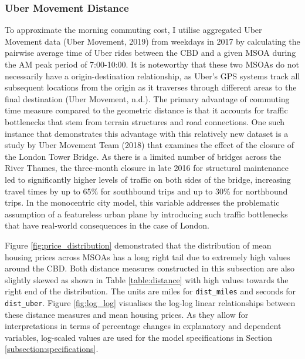 \documentclass{article}
\begin{document}
\subsubsection{Uber Movement Distance}
To approximate the morning commuting cost, I utilise aggregated Uber Movement data (Uber Movement, 2019) from weekdays in 2017 by calculating the pairwise average time of Uber rides between the CBD and a given MSOA during the AM peak period of 7:00-10:00. It is noteworthy that these two MSOAs do not necessarily have a origin-destination relationship, as Uber's GPS systems track all subsequent locations from the origin as it traverses through different areas to the final destination (Uber Movement, n.d.). The primary advantage of commuting time measure compared to the geometric distance is that it accounts for traffic bottlenecks that stem from terrain structures and road connections. One such instance that demonstrates this advantage with this relatively new dataset is a study by Uber Movement Team (2018) that examines the effect of the closure of the London Tower Bridge. As there is a limited number of bridges across the River Thames, the three-month closure in late 2016 for structural maintenance led to significantly higher levels of traffic on both sides of the bridge, increasing travel times by up to 65\% for southbound trips and up to 30\% for northbound trips. In the monocentric city model, this variable addresses the problematic assumption of a featureless urban plane by introducing such traffic bottlenecks that have real-world consequences in the case of London.

Figure \ref{fig:price_distribution} demonstrated that the distribution of mean housing prices across MSOAs has a long right tail due to extremely high values around the CBD. Both distance measures constructed in this subsection are also slightly skewed as shown in Table \ref{table:distance} with high values towards the right end of the distribution. The units are miles for \texttt{dist\_miles} and seconds for \texttt{dist\_uber}. Figure \ref{fig:log_log} visualises the log-log linear relationships between these distance measures and mean housing prices. As they allow for interpretations in terms of percentage changes in explanatory and dependent variables, log-scaled values are used for the model specifications in Section \ref{subsection:specifications}.
\end{document}

